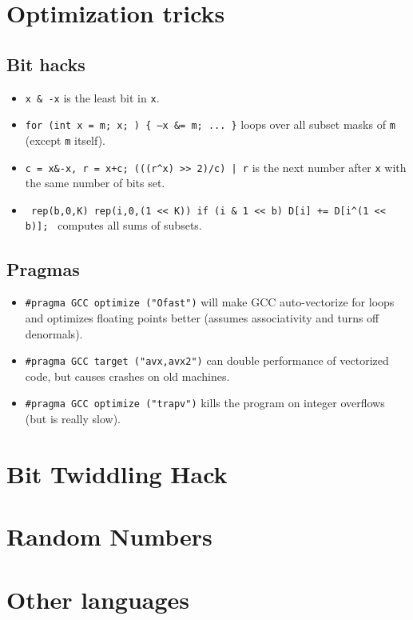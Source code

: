 \section{Optimization tricks}
	\subsection{Bit hacks}
		\begin{itemize}
			\item \texttt{x \& -x} is the least bit in \texttt{x}.
			\item \texttt{for (int x = m; x; ) \{ --x \&= m; ... \}} loops over all subset masks of \texttt{m} (except \texttt{m} itself).
			\item \texttt{c = x\&-x, r = x+c; (((r\^{}x) >> 2)/c) | r} is the next number after \texttt{x} with the same number of bits set.
			\item \texttt{ rep(b,0,K) rep(i,0,(1 << K)) if (i \& 1 << b) D[i] += D[i\^{}(1 << b)]; } computes all sums of subsets.
		\end{itemize}
	\subsection{Pragmas}
		\begin{itemize}
			\item \lstinline{#pragma GCC optimize ("Ofast")} will make GCC auto-vectorize for loops and optimizes floating points better (assumes associativity and turns off denormals).
			\item \lstinline{#pragma GCC target ("avx,avx2")} can double performance of vectorized code, but causes crashes on old machines.
			\item \lstinline{#pragma GCC optimize ("trapv")} kills the program on integer overflows (but is really slow).
		\end{itemize}
\section {Bit Twiddling Hack}
\section {Random Numbers}
\section{Other languages}
